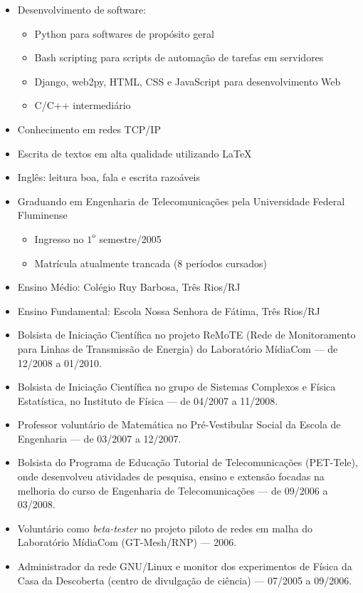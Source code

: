 \documentclass[a4paper,11pt]{article}
\begin{document}
 \begin{itemize}
  \item Desenvolvimento de software:
  \begin{itemize}
   \item Python para softwares de propósito geral
   \item Bash scripting para scripts de automação de tarefas em servidores
   \item Django, web2py, HTML, CSS e JavaScript para desenvolvimento Web
   \item C/C++ intermediário
  \end{itemize}
  \item Conhecimento em redes TCP/IP
  \item Escrita de textos em alta qualidade utilizando \LaTeX
  \item Inglês: leitura boa, fala e escrita razoáveis
 \end{itemize}


 \begin{itemize}
  \item Graduando em Engenharia de Telecomunicações pela Universidade Federal
  Fluminense
  \begin{itemize}
    \item Ingresso no $1^o$ semestre/2005
    \item Matrícula atualmente trancada (8 períodos cursados)
  \end{itemize}
  \item Ensino Médio: Colégio Ruy Barbosa, Três Rios/RJ
  \item Ensino Fundamental: Escola Nossa Senhora de Fátima, Três Rios/RJ
 \end{itemize}


 \begin{itemize}
  \item Bolsista de Iniciação Científica no projeto ReMoTE (Rede de
  Monitoramento para Linhas de Transmissão de Energia) do Laboratório MídiaCom
  --- de 12/2008 a 01/2010.
  \item Bolsista de Iniciação Científica no grupo de Sistemas Complexos e
  Física Estatística, no Instituto de Física
  --- de 04/2007 a 11/2008.
  \item Professor voluntário de Matemática no Pré-Vestibular Social da
  Escola de Engenharia --- de 03/2007 a 12/2007.
  \item Bolsista do Programa de Educação Tutorial de Telecomunicações
  (PET-Tele), onde desenvolveu atividades de
  pesquisa, ensino e extensão focadas na melhoria do curso de Engenharia de
  Telecomunicações --- de 09/2006 a 03/2008.
  \item Voluntário como \textit{beta-tester} no projeto piloto de redes em
  malha do Laboratório MídiaCom (GT-Mesh/RNP) --- 2006.
  \item Administrador da rede GNU/Linux e monitor dos experimentos de Física da
  Casa da Descoberta (centro de divulgação de ciência) --- 07/2005 a
  09/2006.
 \end{itemize}
\end{document}
